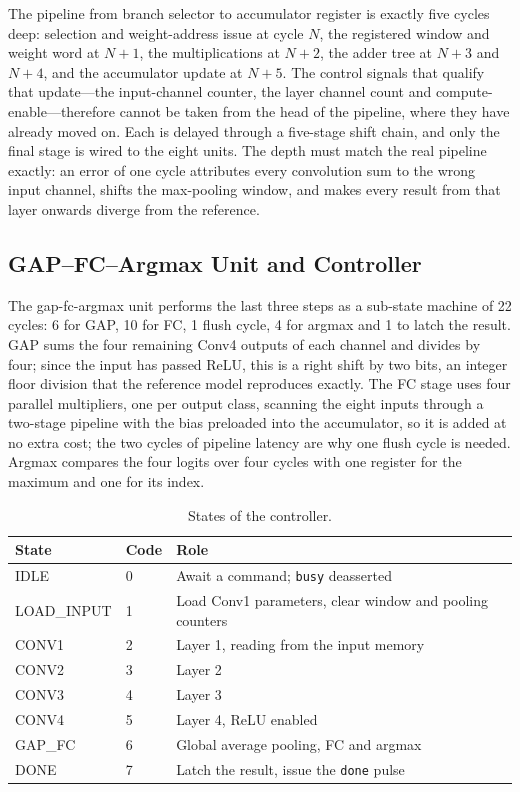 \documentclass[conference,10pt]{IEEEtran}
\begin{document}
The pipeline from branch selector to accumulator register is exactly five cycles
deep: selection and weight-address issue at cycle $N$, the registered window and
weight word at $N{+}1$, the multiplications at $N{+}2$, the adder tree at
$N{+}3$ and $N{+}4$, and the accumulator update at $N{+}5$. The control signals
that qualify that update---the input-channel counter, the layer channel count and
compute-enable---therefore cannot be taken from the head of the pipeline, where
they have already moved on. Each is delayed through a five-stage shift chain, and
only the final stage is wired to the eight units. The depth must match the real
pipeline exactly: an error of one cycle attributes every convolution sum to the
wrong input channel, shifts the max-pooling window, and makes every result from
that layer onwards diverge from the reference.

\subsection{GAP--FC--Argmax Unit and Controller}

The gap-fc-argmax unit performs the last three steps as a sub-state machine of 22
cycles: 6 for GAP, 10 for FC, 1 flush cycle, 4 for argmax and 1 to latch the
result. GAP sums the four remaining Conv4 outputs of each channel and divides by
four; since the input has passed ReLU, this is a right shift by two bits, an
integer floor division that the reference model reproduces exactly. The FC stage
uses four parallel multipliers, one per output class, scanning the eight inputs
through a two-stage pipeline with the bias preloaded into the accumulator, so it
is added at no extra cost; the two cycles of pipeline latency are why one flush
cycle is needed. Argmax compares the four logits over four cycles with one
register for the maximum and one for its index.

\begin{table}[t]
\caption{States of the controller.}
\label{tab:fsm}
\centering
\footnotesize
\begin{tabular}{llp{4.5cm}}
\toprule
State & Code & Role \\
\midrule
IDLE       & 0 & Await a command; \texttt{busy} deasserted \\
LOAD\_INPUT & 1 & Load Conv1 parameters, clear window and pooling counters \\
CONV1      & 2 & Layer 1, reading from the input memory \\
CONV2      & 3 & Layer 2 \\
CONV3      & 4 & Layer 3 \\
CONV4      & 5 & Layer 4, ReLU enabled \\
GAP\_FC     & 6 & Global average pooling, FC and argmax \\
DONE       & 7 & Latch the result, issue the \texttt{done} pulse \\
\bottomrule
\end{tabular}
\end{table}
\end{document}
